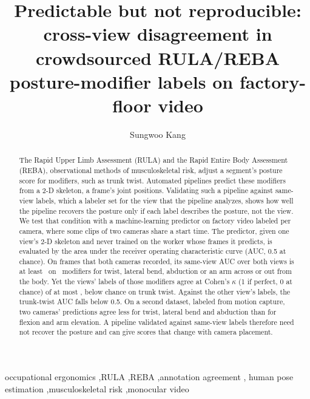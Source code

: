 \documentclass[review,3p,authoryear]{elsarticle}
\begin{document}
\begin{frontmatter}
\title{Predictable but not reproducible: cross-view disagreement in crowdsourced
RULA/REBA posture-modifier labels on factory-floor video}

\author[ece]{Sungwoo Kang}


\begin{abstract}
\linespread{1}\selectfont
The Rapid Upper Limb Assessment (RULA) and the Rapid Entire Body Assessment (REBA),
observational methods of musculoskeletal risk, adjust a segment's posture score for
modifiers, such as trunk twist. Automated pipelines predict these modifiers from a 2-D
skeleton, a frame's joint positions. Validating such a pipeline against same-view labels,
which a labeler set for the view that the pipeline analyzes, shows how well the pipeline
recovers the posture only if each label describes the posture, not the view. We test that condition
with a machine-learning predictor on factory video labeled per camera, where some clips
of two cameras share a start time. The predictor, given one view's 2-D skeleton and
never trained on the worker whose frames it predicts, is evaluated by the area under the
receiver operating characteristic curve (AUC, 0.5 at chance). On frames that both cameras
recorded, its same-view AUC over both views is at least \pairOrientMinAuc\ on
\nOrientModifiers\ modifiers for twist, lateral bend, abduction or an arm across or out
from the body. Yet the views' labels of those modifiers agree at Cohen's $\kappa$ (1 if
perfect, 0 at chance) of at most \maxOrientXviewKappa, below chance on trunk twist.
Against the other view's labels, the trunk-twist AUC falls below 0.5. On a second dataset,
labeled from motion capture, two cameras' predictions agree less for twist, lateral bend and
abduction than for flexion and arm elevation. A pipeline validated against same-view labels therefore
need not recover the posture and can give scores that change with camera placement.
\end{abstract}

\begin{keyword}
occupational ergonomics \sep RULA \sep REBA \sep annotation agreement \sep
human pose estimation \sep musculoskeletal risk \sep monocular video
\end{keyword}
\end{frontmatter}
\end{document}
